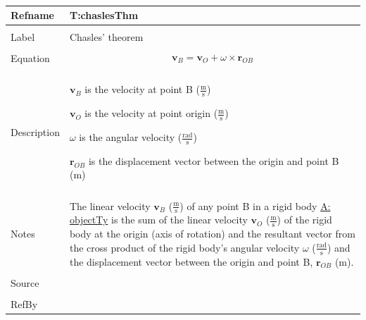 \documentclass[12pt]{article}
\begin{document}
~\newline
\noindent \begin{minipage}{\textwidth}
\begin{tabular}{p{} p{}}
\toprule \textbf{Refname} & \textbf{T:chaslesThm}
\label{T:chaslesThm}
\\ \midrule \\
Label & Chasles' theorem
\\ \midrule \\
Equation & \begin{dmath}
           {\mathbf{v}_{B}}={\mathbf{v}_{O}}+ω\times{\mathbf{r}_{OB}}
           \end{dmath}
\\ \midrule \\
Description & \begin{symbDescription}
              \item{${\mathbf{v}_{B}}$ is the velocity at point B ($\frac{\text{m}}{\text{s}}$)}
              \item{${\mathbf{v}_{O}}$ is the velocity at point origin ($\frac{\text{m}}{\text{s}}$)}
              \item{$ω$ is the angular velocity ($\frac{\text{rad}}{\text{s}}$)}
              \item{${\mathbf{r}_{OB}}$ is the displacement vector between the origin and point B (m)}
              \end{symbDescription}
\\ \midrule \\
Notes & The linear velocity ${\mathbf{v}_{B}}$ ($\frac{\text{m}}{\text{s}}$) of any point B in a rigid body \hyperref[A:objectTy]{A: objectTy} is the sum of the linear velocity ${\mathbf{v}_{O}}$ ($\frac{\text{m}}{\text{s}}$) of the rigid body at the origin (axis of rotation) and the resultant vector from the cross product of the rigid body's angular velocity $ω$ ($\frac{\text{rad}}{\text{s}}$) and the displacement vector between the origin and point B, ${\mathbf{r}_{OB}}$ (m).
\\ \midrule \\
Source & 
\\ \midrule \\
RefBy & 
\\ \bottomrule \end{tabular}
\end{minipage}\\
~\newline
\end{document}
